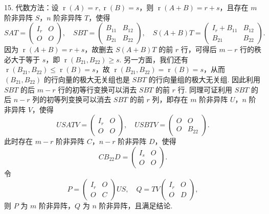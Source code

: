 \documentclass[UTF8,12pt,a4paper,fontset=fandol]{ctexart}
\begin{document}
15. 代数方法：设 $\operatorname{r}(A)=r,\operatorname{r}(B)=s$，则 $\operatorname{r}(A+B)=r+s$，且存在 $m$ 阶非异阵 $S$，$n$ 阶非异阵 $T$，使得
\[
SAT=\left(\begin{array}{cc}I_r&O\\O&O\end{array}\right),\quad
SBT=\left(\begin{array}{cc}B_{11}&B_{12}\\B_{21}&B_{22}\end{array}\right),\quad
S(A+B)T=\left(\begin{array}{cc}I_r+B_{11}&B_{12}\\B_{21}&B_{22}\end{array}\right).
\]
因为 $\operatorname{r}(A+B)=r+s$，故删去 $S(A+B)T$ 的前 $r$ 行，可得后 $m-r$ 行的秩必大于等于 $s$，即 $\operatorname{r}(B_{21},B_{22})\ge s$. 另一方面，我们还有 $\operatorname{r}(B_{21},B_{22})\le\operatorname{r}(B)=s$，故 $\operatorname{r}(B_{21},B_{22})=\operatorname{r}(B)=s$，从而 $(B_{21},B_{22})$ 的行向量的极大无关组也是 $SBT$ 的行向量组的极大无关组. 因此利用 $SBT$ 的后 $m-r$ 行的初等行变换可以消去 $SBT$ 的前 $r$ 行. 同理可证利用 $SBT$ 的后 $n-r$ 列的初等列变换可以消去 $SBT$ 的前 $r$ 列，即存在 $m$ 阶非异阵 $U$，$n$ 阶非异阵 $V$，使得
\[
USATV=\left(\begin{array}{cc}I_r&O\\O&O\end{array}\right),\quad
USBTV=\left(\begin{array}{cc}O&O\\O&B_{22}\end{array}\right).
\]
此时存在 $m-r$ 阶非异阵 $C$，$n-r$ 阶非异阵 $D$，使得
\[
CB_{22}D=\left(\begin{array}{cc}I_s&O\\O&O\end{array}\right).
\]
令
\[
P=\left(\begin{array}{cc}I_r&O\\O&C\end{array}\right)US,\quad
Q=TV\left(\begin{array}{cc}I_r&O\\O&D\end{array}\right),
\]
则 $P$ 为 $m$ 阶非异阵，$Q$ 为 $n$ 阶非异阵，且满足结论.
\end{document}
